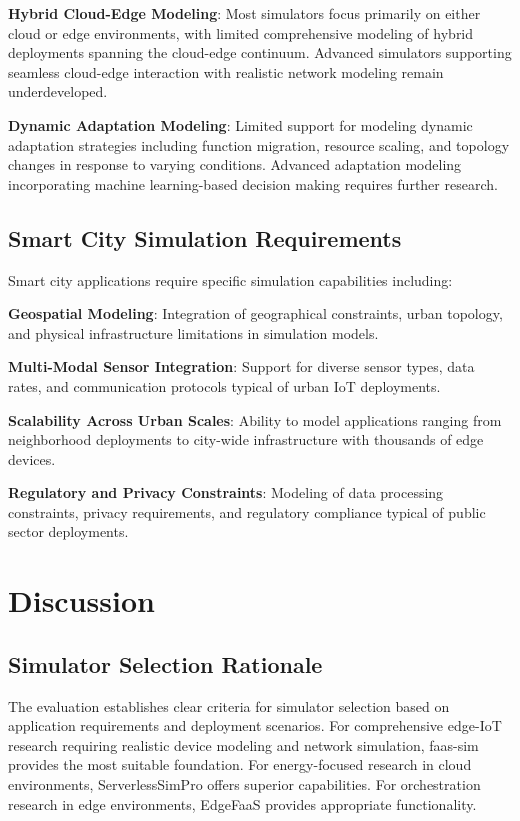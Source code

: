 \textbf{Hybrid Cloud-Edge Modeling}: Most simulators focus primarily on either cloud or edge environments, with limited comprehensive modeling of hybrid deployments spanning the cloud-edge continuum. Advanced simulators supporting seamless cloud-edge interaction with realistic network modeling remain underdeveloped.

\textbf{Dynamic Adaptation Modeling}: Limited support for modeling dynamic adaptation strategies including function migration, resource scaling, and topology changes in response to varying conditions. Advanced adaptation modeling incorporating machine learning-based decision making requires further research.

\subsection{Smart City Simulation Requirements}

Smart city applications require specific simulation capabilities including:

\textbf{Geospatial Modeling}: Integration of geographical constraints, urban topology, and physical infrastructure limitations in simulation models.

\textbf{Multi-Modal Sensor Integration}: Support for diverse sensor types, data rates, and communication protocols typical of urban IoT deployments.

\textbf{Scalability Across Urban Scales}: Ability to model applications ranging from neighborhood deployments to city-wide infrastructure with thousands of edge devices.

\textbf{Regulatory and Privacy Constraints}: Modeling of data processing constraints, privacy requirements, and regulatory compliance typical of public sector deployments.

\section{Discussion}

\subsection{Simulator Selection Rationale}

The evaluation establishes clear criteria for simulator selection based on application requirements and deployment scenarios. For comprehensive edge-IoT research requiring realistic device modeling and network simulation, faas-sim provides the most suitable foundation. For energy-focused research in cloud environments, ServerlessSimPro offers superior capabilities. For orchestration research in edge environments, EdgeFaaS provides appropriate functionality.

